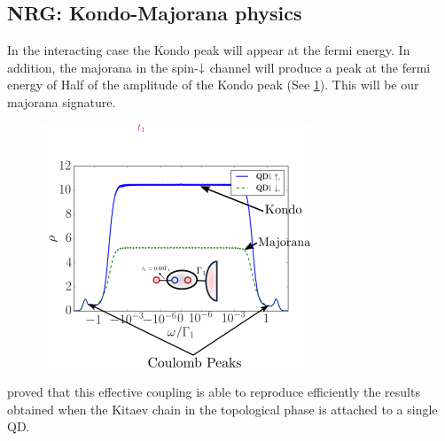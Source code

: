 \subsection{NRG: Kondo-Majorana physics}
In the interacting case the Kondo peak will appear at the fermi energy. In addition, the majorana in the spin-$\downarrow$ channel will produce a peak at the fermi energy of Half of the amplitude of the Kondo peak (See \ref{fig:NRG-1M}). This will be our majorana signature. 
\begin{figure}[H]
\centering
\includegraphics[scale=0.7]{IMAGES/Majorana/NRG.png}

\caption{  \label{fig:NRG-1M} \protect{}}
\end{figure}


 \citeauthor{ruiz-tijerina_interaction_2015}  proved that this effective coupling  is able to reproduce efficiently the results obtained when the Kitaev chain in the topological phase is attached to a single QD. 





